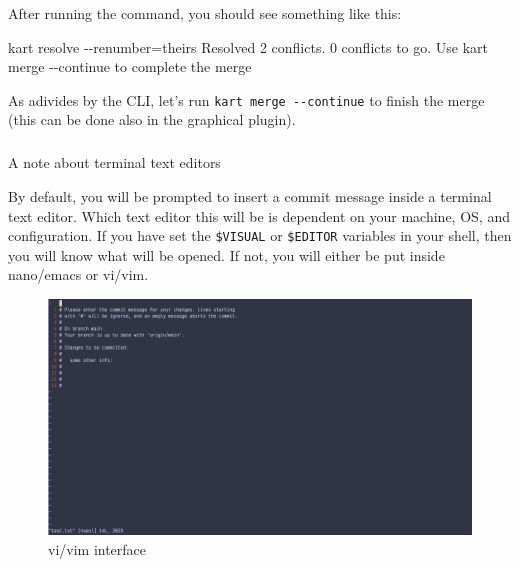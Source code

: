 \documentclass[
  letterpaper,
  DIV=11,
  numbers=noendperiod]{scrartcl}
\makeatletter
\let\oldsubparagraph\subparagraph
\renewcommand{\subparagraph}{
    \@ifstar
      \xxxSubParagraphStar
      \xxxSubParagraphNoStar
  }
\newcommand{\xxxSubParagraphStar}[1]{\oldsubparagraph*{#1}\mbox{}}
\newcommand{\xxxSubParagraphNoStar}[1]{\oldsubparagraph{#1}\mbox{}}
\newenvironment{Shaded}{\begin{snugshade}}{\end{snugshade}}
\newcommand{\AttributeTok}[1]{\textcolor[rgb]{1.00,0.47,0.78}{#1}}
\newcommand{\ExtensionTok}[1]{\textcolor[rgb]{0.55,0.91,0.99}{#1}}
\newcommand{\KeywordTok}[1]{\textcolor[rgb]{1.00,0.47,0.78}{#1}}
\newcommand{\NormalTok}[1]{\textcolor[rgb]{0.97,0.97,0.95}{#1}}
\newcommand{\OperatorTok}[1]{\textcolor[rgb]{0.97,0.97,0.95}{#1}}
\makeatother
\begin{document}
After running the command, you should see something like this:

\begin{Shaded}
\begin{Highlighting}[]
\ExtensionTok{kart}\NormalTok{ resolve }\AttributeTok{{-}{-}renumber}\OperatorTok{=}\NormalTok{theirs}
\ExtensionTok{Resolved}\NormalTok{ 2 conflicts. 0 conflicts to go.}
\ExtensionTok{Use} \KeywordTok{\textasciigrave{}}\ExtensionTok{kart}\NormalTok{ merge }\AttributeTok{{-}{-}continue}\KeywordTok{\textasciigrave{}}\NormalTok{ to complete the merge}
\end{Highlighting}
\end{Shaded}

As adivides by the CLI, let's run \texttt{kart\ merge\ -\/-continue} to
finish the merge (this can be done also in the graphical plugin).

\subparagraph{A note about terminal text
editors}\label{sec-text-editors}

By default, you will be prompted to insert a commit message inside a
terminal text editor. Which text editor this will be is dependent on
your machine, OS, and configuration. If you have set the
\texttt{\$VISUAL} or \texttt{\$EDITOR} variables in your shell, then you
will know what will be opened. If not, you will either be put inside
nano/emacs or vi/vim.

\begin{tcolorbox}[enhanced jigsaw, colframe=quarto-callout-note-color-frame, colbacktitle=quarto-callout-note-color!10!white, rightrule=.15mm, opacitybacktitle=0.6, opacityback=0, bottomrule=.15mm, coltitle=black, title={With some possible differences, the interface will be like this for
vi/vim}, left=2mm, bottomtitle=1mm, toptitle=1mm, toprule=.15mm, breakable, titlerule=0mm, colback=white, leftrule=.75mm, arc=.35mm]

\begin{figure}[H]

{\centering \includegraphics{img/vi_interface.png}

}

\caption{vi/vim interface}

\end{figure}%

\end{tcolorbox}
\end{document}
